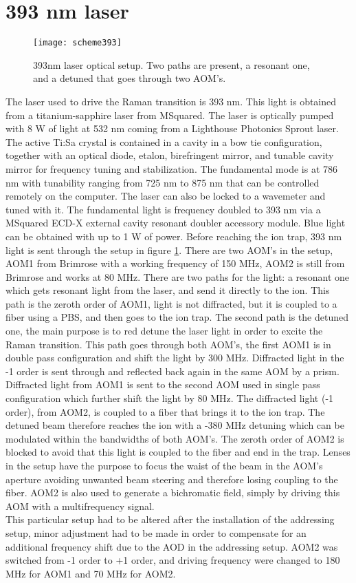 \section{393 nm laser}
\begin{figure}
\centering
\texttt{[image: scheme393]}
\caption{393nm laser optical setup. Two paths are present, a resonant one, and a detuned that goes through two AOM's.}
\label{scheme393}
\end{figure}
The laser used to drive the Raman transition is 393 nm. This light is obtained from a titanium-sapphire laser from MSquared. The laser is optically pumped with 8 W of light at 532 nm coming from a Lighthouse Photonics Sprout laser. The active Ti:Sa crystal is contained in a cavity in a bow tie configuration, together with an optical diode, etalon, birefringent mirror, and tunable cavity mirror for frequency tuning and stabilization. The fundamental mode is at 786 nm with tunability ranging from 725 nm to 875 nm that can be controlled remotely on the computer. The laser can also be locked to a wavemeter and tuned with it.
The fundamental light is frequency doubled to 393 nm via a MSquared ECD-X external cavity resonant doubler accessory module. Blue light can be obtained with up to 1 W of power. Before reaching the ion trap, 393 nm light is sent through the setup in figure \ref{scheme393}. There are two AOM's in the setup, AOM1 from Brimrose with a working frequency of 150 MHz, AOM2 is still from Brimrose and works at 80 MHz. There are two paths for the light: a resonant one which gets resonant light from the laser, and send it directly to the ion. This path is the zeroth order of AOM1, light is not diffracted, but it is coupled to a fiber using a PBS, and then goes to the ion trap. The second path is the detuned one, the main purpose is to red detune the laser light in order to excite the Raman transition. This path goes through both AOM's, the first AOM1 is in double pass configuration and shift the light by 300 MHz. Diffracted light in the -1 order is sent through and reflected back again in the same AOM by a prism. Diffracted light from AOM1 is sent to the second AOM used in single pass configuration which further shift the light by 80 MHz. The diffracted light (-1 order), from AOM2, is coupled to a fiber that brings it to the ion trap. The detuned beam therefore reaches the ion with a -380 MHz detuning which can be modulated within the bandwidths of both AOM's. The zeroth order of AOM2 is blocked to avoid that this light is coupled to the fiber and end in the trap. Lenses in the setup have the purpose to focus the waist of the beam in the AOM's aperture avoiding unwanted beam steering and therefore losing coupling to the fiber.
AOM2 is also used to generate a bichromatic field, simply by driving this AOM with a multifrequency signal.\\
This particular setup had to be altered after the installation of the addressing setup, minor adjustment had to be made in order to compensate for an additional frequency shift due to the AOD in the addressing setup. AOM2 was switched from -1 order to +1 order, and driving frequency were changed to 180 MHz for AOM1 and 70 MHz for AOM2.

